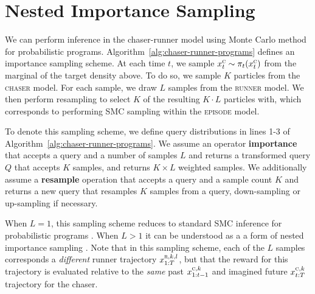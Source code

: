 \documentclass[twoside]{article}
\begin{document}
\vspace{-0.25em}
\section{Nested Importance Sampling}
\vspace{-0.25em}

We can perform inference in the chaser-runner model using Monte Carlo method for probabilistic programs. Algorithm~\ref{alg:chaser-runner-programs} defines an importance sampling scheme. At each time $t$, we sample $x^\textsc{c}_t \sim \pi_t(x^\textsc{c}_t)$ from the marginal of the target density above. To do so, we sample $K$ particles from the \textsc{chaser} model. For each sample, we draw $L$ samples from the \textsc{runner} model. We then perform resampling to select $K$ of the resulting $K \cdot L$ particles with, which corresponds to performing SMC sampling within the \textsc{episode} model. 

To denote this sampling scheme, we define query distributions in lines 1-3 of Algorithm~\ref{alg:chaser-runner-programs}. We assume an operator \textbf{importance} that accepts a query and a number of samples $L$ and returns a transformed query $Q$ that accepts $K$ samples, and returns $K \times L$ weighted samples. We additionally assume a \textbf{resample} operation that accepts a query and a sample count $K$ and returns a new query that resamples $K$ samples from a query, down-sampling or up-sampling if necessary. 

When $L=1$, this sampling scheme reduces to standard SMC inference for probabilistic programs \cite{wood-aistats-2014}. When $L>1$ it can be understood as a a form of nested importance sampling \cite{naesseth2015nested}. Note that in this sampling scheme, each of the $L$ samples corresponds a \emph{different} runner trajectory $x^{\textsc{r},k,l}_{1:T}$, but that the reward for this trajectory is evaluated relative to the \emph{same} past $x^{\textsc{c},k}_{1:t-1}$ and imagined future $x^{\textsc{c},k}_{t:T}$ trajectory for the chaser. 
\end{document}
